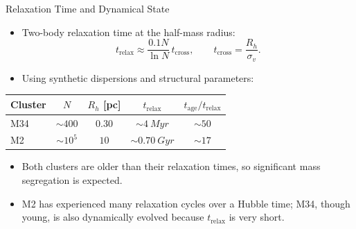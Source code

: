 \documentclass{beamer}
\begin{document}
\begin{frame}{Relaxation Time and Dynamical State}
    \begin{itemize}
        \item Two-body relaxation time at the half-mass radius:
        \[
            t_{\mathrm{relax}} \approx \frac{0.1 N}{\ln N}\, t_{\mathrm{cross}},
            \qquad
            t_{\mathrm{cross}} = \frac{R_h}{\sigma_v}.
        \]
        \item Using synthetic dispersions and structural parameters:
    \end{itemize}
    \begin{table}
        \centering
        \begin{tabular}{lcccc}
            \toprule
            Cluster & $N$ & $R_h$ [pc] & $t_{\mathrm{relax}}$ & $t_{\mathrm{age}}/t_{\mathrm{relax}}$ \\
            \midrule
            M34 & $\sim 400$   & $0.30$ & $\sim \SI{4}{Myr}$   & $\sim 50$ \\
            M2  & $\sim 10^{5}$ & $10$  & $\sim \SI{0.70}{Gyr}$ & $\sim 17$ \\
            \bottomrule
        \end{tabular}
    \end{table}
    \begin{itemize}
        \item Both clusters are older than their relaxation times, so significant mass segregation is expected.
        \item M2 has experienced many relaxation cycles over a Hubble time; M34, though young, is also dynamically evolved because $t_{\mathrm{relax}}$ is very short.
    \end{itemize}
    \cite{binney2008}
\end{frame}
\end{document}
